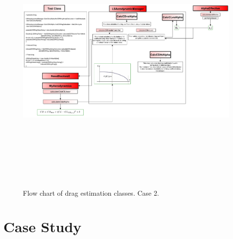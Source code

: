 \begin{figure}[H]
\centering
{\includegraphics[height=12.9cm, angle=90]{immagini/dragflowchart3.pdf}}
\caption{Flow chart of drag estimation classes. Case 2.}
\label{fig:cd}
\end{figure}




\section{Case Study}

